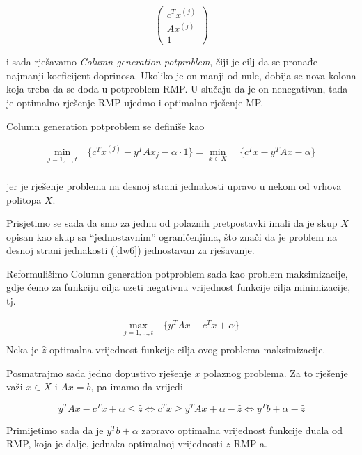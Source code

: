 \documentclass[a4paper, utf8, 11pt, colorlinks]{book}
\begin{document}
 $$\left(\begin{array}{c}
 	c^T x^{(j)}\\
 	A x^{(j)} \\
 	1 
 \end{array}\right)$$
 
 i sada rješavamo \emph{Column generation potproblem}, čiji je cilj da se pronađe najmanji koeficijent doprinosa. Ukoliko je on manji od nule, dobija se nova kolona koja treba da se doda u potproblem RMP.  U slučaju da je on nenegativan, tada je optimalno rješenje RMP ujedmo i optimalno rješenje MP.
 
 Column generation potproblem se definiše kao
 
      \begin{equation}
 	\begin{aligned}\label{dw6}
 		\min_{j=1,\ldots,t}\  & \{c^T x^{(j)} -y^T	Ax_j-\alpha\cdot 1\}=\min_{x\in X}\  & \{c^Tx-y^T	Ax-\alpha\}\\
 	\end{aligned}
 \end{equation}
 
jer je rješenje problema na desnoj strani jednakosti upravo u nekom od vrhova politopa $X$.

Prisjetimo se sada da smo za jednu od polaznih pretpostavki imali da je skup $X$ opisan kao skup sa ``jednostavnim'' ograničenjima, što znači da je problem na desnoj strani jednakosti (\ref{dw6}) jednostavan za rješavanje.

Reformulišimo  Column generation potproblem sada kao problem maksimizacije, gdje ćemo za funkciju cilja uzeti negativnu vrijednost funkcije cilja minimizacije, tj.
 
 
       \begin{equation}
 	\begin{aligned}\label{dw7}
 		\max_{j=1,\ldots,t}\  &  \{y^T	Ax-c^Tx+\alpha\}\\
 	\end{aligned}
 \end{equation}
Neka je $\hat{z}$ optimalna vrijednost funkcije cilja ovog problema maksimizacije.

Posmatrajmo sada jedno dopustivo rješenje $x$ polaznog problema. Za to rješenje važi 
$x\in X$ i $Ax=b$, pa imamo da vrijedi %
 
 $$y^T	Ax-c^Tx+\alpha\leqslant \hat{z} \Leftrightarrow c^Tx\geqslant y^T	Ax+\alpha-\hat{z} \Leftrightarrow  y^T b+\alpha-\hat{z}$$
 
 Primijetimo sada da je  $y^T b+\alpha$ zapravo  optimalna vrijednost funkcije duala od RMP, koja je dalje, jednaka optimalnoj vrijednosti $\overline{z}$ RMP-a. 
 
\end{document}
